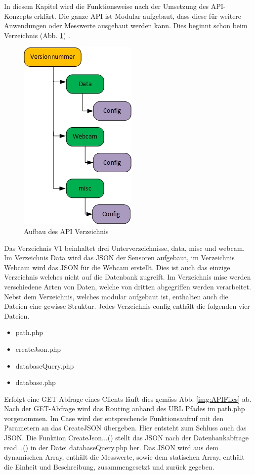 In diesem Kapitel wird die Funktionsweise nach der Umsetzung des API-Konzepts erklärt. Die ganze API ist Modular aufgebaut, dass diese für weitere Anwendungen oder Messwerte ausgebaut werden kann. Dies beginnt schon beim Verzeichnis (Abb. \ref{img:APIVerzeichnis}) .


\begin{figure}[h!]
	\centering
	\includegraphics[width=0.3\linewidth]{img/APIVerzeichnis.jpg}
	\caption{Aufbau des API Verzeichnis}
	\label{img:APIVerzeichnis}
\end{figure}

Das Verzeichnis V1 beinhaltet drei Unterverzeichnisse, data, misc und webcam. Im Verzeichnis Data wird das JSON der Sensoren aufgebaut, im Verzeichnis Webcam wird das JSON für die Webcam erstellt. Dies ist auch das einzige Verzeichnis welches nicht auf die Datenbank zugreift. Im Verzeichnis misc werden verschiedene Arten von Daten, welche von dritten abgegriffen werden verarbeitet. Nebst dem Verzeichnis, welches modular aufgebaut ist, enthalten auch die Dateien eine gewisse Struktur. Jedes Verzeichnis config enthält die folgenden vier Dateien. 
\begin{itemize}
\item path.php
\item createJson.php
\item databaseQuery.php
\item database.php
\end{itemize}

Erfolgt eine GET-Abfrage eines Clients läuft dies gemäss Abb. \ref{img:APIFiles}  ab. Nach der GET-Abfrage wird das Routing anhand des URL Pfades im path.php vorgenommen. Im Case wird der entsprechende Funktionsaufruf mit den Parametern an das CreateJSON übergeben. Hier entsteht zum Schluss auch das JSON. Die Funktion CreateJson...() stellt das JSON nach der Datenbankabfrage read...() in der Datei databaseQuery.php her. Das JSON wird aus dem dynamischen Array, enthält die Messwerte, sowie dem statischen Array, enthält die Einheit und Beschreibung, zusammengesetzt und zurück gegeben. 

